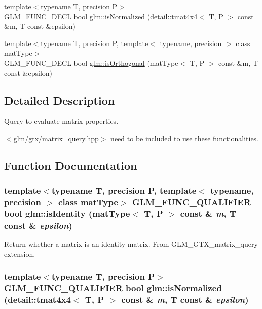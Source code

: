\begin{CompactItemize}
\item 
{\footnotesize template$<$typename T, precision P$>$ }\\GLM\_\-FUNC\_\-DECL bool \hyperlink{group__gtx__matrix__query_g0005612df8bcf46d6dda35d373a61fbb}{glm::isNormalized} (detail::tmat4x4$<$ T, P $>$ const \&m, T const \&epsilon)
\item 
{\footnotesize template$<$typename T, precision P, template$<$ typename, precision $>$ class matType$>$ }\\GLM\_\-FUNC\_\-DECL bool \hyperlink{group__gtx__matrix__query_gbaeee016acd42f7a58bd1de063a3061b}{glm::isOrthogonal} (matType$<$ T, P $>$ const \&m, T const \&epsilon)
\end{CompactItemize}


\subsection{Detailed Description}
Query to evaluate matrix properties. 

$<$glm/gtx/matrix\_\-query.hpp$>$ need to be included to use these functionalities. 

\subsection{Function Documentation}
\hypertarget{group__gtx__matrix__query_gb4ab3ce59ca59a610875732215027cc3}{
\subsubsection[isIdentity]{\setlength{\rightskip}{0pt plus 5cm}template$<$typename T, precision P, template$<$ typename, precision $>$ class matType$>$ GLM\_\-FUNC\_\-QUALIFIER bool glm::isIdentity (matType$<$ T, P $>$ const \& {\em m}, \/  T const \& {\em epsilon})}}
\label{group__gtx__matrix__query_gb4ab3ce59ca59a610875732215027cc3}


Return whether a matrix is an identity matrix. From GLM\_\-GTX\_\-matrix\_\-query extension. \hypertarget{group__gtx__matrix__query_g0005612df8bcf46d6dda35d373a61fbb}{
\subsubsection[isNormalized]{\setlength{\rightskip}{0pt plus 5cm}template$<$typename T, precision P$>$ GLM\_\-FUNC\_\-QUALIFIER bool glm::isNormalized (detail::tmat4x4$<$ T, P $>$ const \& {\em m}, \/  T const \& {\em epsilon})}}
\label{group__gtx__matrix__query_g0005612df8bcf46d6dda35d373a61fbb}


